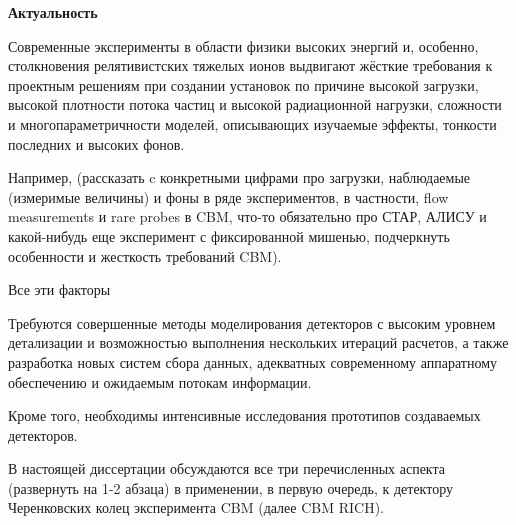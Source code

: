 \textbf{Актуальность}

Современные эксперименты в области физики высоких энергий и, особенно, столкновения релятивистских тяжелых ионов выдвигают жёсткие требования к проектным решениям при создании установок по причине высокой загрузки, высокой плотности потока частиц и высокой радиационной нагрузки, сложности и многопараметричности моделей, описывающих изучаемые эффекты, тонкости последних и высоких фонов.

Например, (рассказать c конкретными цифрами про загрузки, наблюдаемые (измеримые величины) и фоны в ряде экспериментов, в частности, flow measurements и rare probes в CBM, что-то обязательно про СТАР, АЛИСУ и какой-нибудь еще эксперимент с фиксированной мишенью, подчеркнуть особенности и жесткость требований CBM).

Все эти факторы

Требуются совершенные методы моделирования детекторов с высоким уровнем детализации и возможностью выполнения нескольких итераций расчетов, а также разработка новых систем сбора данных, адекватных современному аппаратному обеспечению и ожидаемым потокам информации.

Кроме того, необходимы интенсивные исследования прототипов создаваемых детекторов.

В настоящей диссертации обсуждаются все три перечисленных аспекта (развернуть на 1-2 абзаца) в применении, в первую очередь, к детектору Черенковских колец эксперимента CBM (далее CBM RICH).
